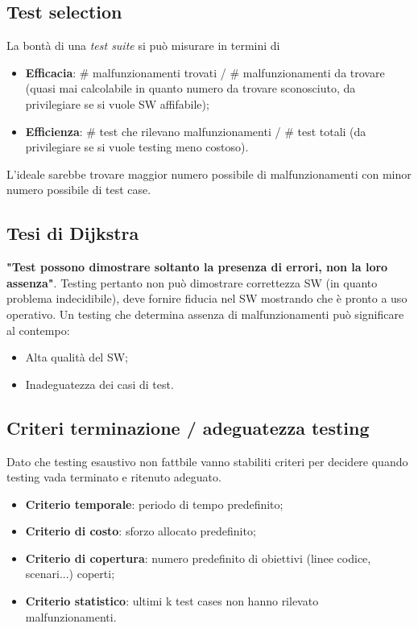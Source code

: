 \documentclass{article}
\begin{document}
    \subsection{Test selection}
      La bontà di una \textit{test suite} si può misurare in termini di
      \begin{itemize}
          \item \textbf{Efficacia}: \# malfunzionamenti trovati / \# malfunzionamenti da trovare (quasi mai calcolabile in quanto numero da trovare sconosciuto, da privilegiare se si vuole SW affifabile);
          \item \textbf{Efficienza}: \# test che rilevano malfunzionamenti / \# test totali (da privilegiare se si vuole testing meno costoso).
      \end{itemize}
      L'ideale sarebbe trovare maggior numero possibile di malfunzionamenti con minor numero possibile di test case.
    \subsection{Tesi di Dijkstra}
      \textbf{"Test possono dimostrare soltanto la presenza di errori, non la loro assenza"}. Testing pertanto non può dimostrare correttezza SW (in quanto problema indecidibile), deve fornire fiducia nel SW mostrando che è pronto a uso operativo. Un testing che determina assenza di malfunzionamenti può significare al contempo:
      \begin{itemize}
          \item Alta qualità del SW;
          \item Inadeguatezza dei casi di test.
      \end{itemize}
    \subsection{Criteri terminazione / adeguatezza testing}
      Dato che testing esaustivo non fattbile vanno stabiliti criteri per decidere quando testing vada terminato e ritenuto adeguato.
      \begin{itemize}
          \item \textbf{Criterio temporale}: periodo di tempo predefinito;
          \item \textbf{Criterio di costo}: sforzo allocato predefinito;
          \item \textbf{Criterio di copertura}: numero predefinito di obiettivi (linee codice, scenari...) coperti;
          \item \textbf{Criterio statistico}: ultimi k test cases non hanno rilevato malfunzionamenti.
      \end{itemize}
\end{document}

